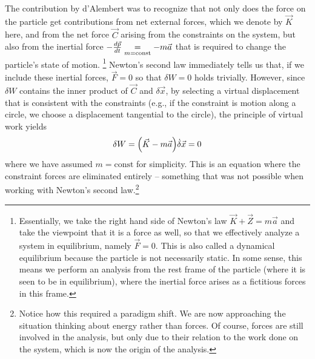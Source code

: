 \documentclass[../class_mech_main.tex]{subfiles}
\begin{document}
The contribution by d'Alembert was to recognize that not only does the force on the particle get contributions from net external forces, which we denote by $\vec{K}$ here, and from the net force $\vec{C}$ arising from the constraints on the system, but also from the inertial force $- \dv{\vec{p}}{t} \underset{m = \text{const}}{=} - m \vec{a}$ that is required to change the particle's state of motion.
\footnote{Essentially, we take the right hand side of Newton's law $\vec{K} + \vec{Z} = m \vec{a}$ and take the viewpoint that it is a force as well, so that we effectively analyze a system in equilibrium, namely $\vec{F} = 0$. This is also called a dynamical equilibrium because the particle is not necessarily static. In some sense, this means we perform an analysis from the rest frame of the particle (where it is seen to be in equilibrium), where the inertial force arises as a fictitious forces in this frame.}
Newton's second law immediately tells us that, if we include these inertial forces, $\vec{F} = 0$ so that $\delta W = 0$ holds trivially. However, since $\delta W$ contains the inner product of $\vec{C}$ and $\delta \vec{x}$, by selecting a virtual displacement that is consistent with the constraints (e.g., if the constraint is motion along a circle, we choose a displacement tangential to the circle), the principle of virtual work yields
\begin{equation}
	\delta W = \qty(\vec{K} - m \vec{a}) \dot \delta \vec{x} = 0
\end{equation}
where we have assumed $m = \text{const}$ for simplicity. This is an equation where the constraint forces are eliminated entirely -- something that was not possible when working with Newton's second law.\footnote{Notice how this required a paradigm shift. We are now approaching the situation thinking about energy rather than forces. Of course, forces are still involved in the analysis, but only due to their relation to the work done on the system, which is now the origin of the analysis.}

\end{document}
